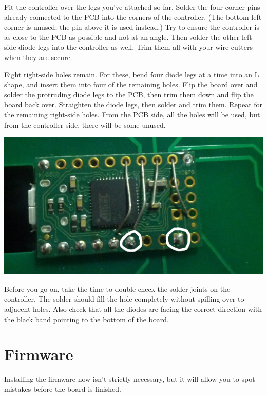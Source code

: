 \documentclass[landscape,twocolumn]{article}
\begin{document}
Fit the controller over the legs you've attached so far. Solder the
four corner pins already connected to the PCB into the corners of the
controller. (The bottom left corner is unused; the pin above it is used
instead.) Try to ensure the controller is as close to the PCB as
possible and not at an angle. Then solder the other left-side diode
legs into the controller as well. Trim them all with your wire
cutters when they are secure.

\vspace{1em}

Eight right-side holes remain. For these, bend four diode legs at a
time into an L shape, and insert them into four of the remaining
holes. Flip the board over and solder the protruding diode legs to the
PCB, then trim them down and flip the board back over. Straighten the
diode legs, then solder and trim them. Repeat for the remaining
right-side holes. From the PCB side, all the holes will be used, but
from the controller side, there will be some unused.

\vspace{1em}
\begin{center}
  \includegraphics[width=0.8\columnwidth]{bent-legs.jpg}
\end{center}
\vspace{1em}

Before you go on, take the time to double-check the solder joints on
the controller. The solder should fill the hole completely without
spilling over to adjacent holes. Also check that all the diodes are
facing the correct direction with the black band pointing to the
bottom of the board.

\section{Firmware}

Installing the firmware now isn't strictly necessary, but it will
allow you to spot mistakes before the board is finished.
\end{document}
